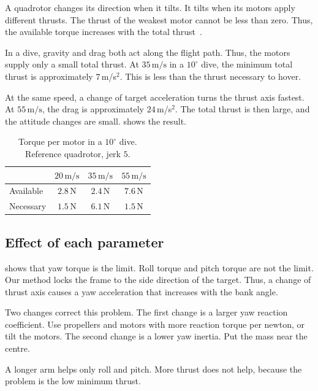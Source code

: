 \documentclass[11pt]{article}
\newcommand{\ms}{\,\mathrm{m/s}}
\begin{document}
A quadrotor changes its direction when it tilts.
It tilts when its motors apply different thrusts.
The thrust of the weakest motor cannot be less than zero.
Thus, the available torque increases with the total thrust~\cite{mahony2012}.

In a dive, gravity and drag both act along the flight path.
Thus, the motors supply only a small total thrust.
At $35\ms$ in a $10^\circ$ dive, the minimum total thrust is approximately $7$\,m/s$^2$.
This is less than the thrust necessary to hover.

At the same speed, a change of target acceleration turns the thrust axis fastest.
At $55\ms$, the drag is approximately $24$\,m/s$^2$.
The total thrust is then large, and the attitude changes are small.
 shows the result.

\begin{table}[h]
\centering
\caption{Torque per motor in a $10^\circ$ dive. Reference quadrotor, jerk $5$.}
\label{tab:dive}
\begin{tabular}{@{}lccc@{}}
\toprule
 & $20\ms$ & $35\ms$ & $55\ms$ \\
\midrule
Available & $2.8$\,N & $\mathbf{2.4}$\,N & $7.6$\,N \\
Necessary & $1.5$\,N & $\mathbf{6.1}$\,N & $1.5$\,N \\
\bottomrule
\end{tabular}
\end{table}

\subsection{Effect of each parameter}

 shows that yaw torque is the limit.
Roll torque and pitch torque are not the limit.
Our method locks the frame to the side direction of the target.
Thus, a change of thrust axis causes a yaw acceleration that increases with the bank angle.

Two changes correct this problem.
The first change is a larger yaw reaction coefficient.
Use propellers and motors with more reaction torque per newton, or tilt the motors.
The second change is a lower yaw inertia.
Put the mass near the centre.

A longer arm helps only roll and pitch.
More thrust does not help, because the problem is the low minimum thrust.
\end{document}
